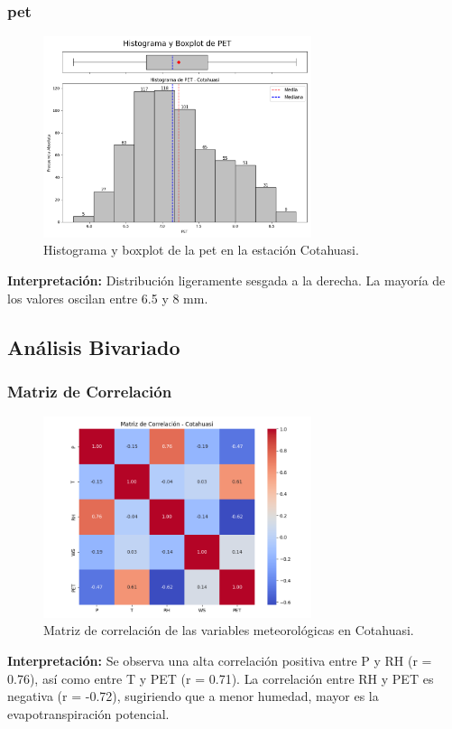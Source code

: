 \subsubsection*{\gls{pet} }
\begin{figure}[htbp]
\centering
\includegraphics[width=0.7\textwidth]{resultados/por_estacion_meteorologica/Cotahuasi/PET_histograma.png}
\caption{Histograma y boxplot de la \gls{pet}  en la estación Cotahuasi.}
\label{fig:cotahuasi_PET}
\end{figure}
\textbf{Interpretación:} Distribución ligeramente sesgada a la derecha. La mayoría de los valores oscilan entre 6.5 y 8 mm.

\subsection{Análisis Bivariado}

\subsubsection*{Matriz de Correlación}
\begin{figure}[htbp]
\centering
\includegraphics[width=0.7\textwidth]{resultados/por_estacion_meteorologica/Cotahuasi/matriz_correlacion.png}
\caption{Matriz de correlación de las variables meteorológicas en Cotahuasi.}
\label{fig:cotahuasi_corr}
\end{figure}
\textbf{Interpretación:} Se observa una alta correlación positiva entre P y RH (r = 0.76), así como entre T y PET (r = 0.71). La correlación entre RH y PET es negativa (r = -0.72), sugiriendo que a menor humedad, mayor es la evapotranspiración potencial.


